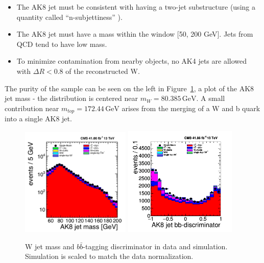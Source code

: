 \begin{itemize}
\item
The AK8 jet must be consistent with having a two-jet substructure (using a quantity called ``n-subjettiness'' \cite{njet1, njet2}).
\item
The AK8 jet must have a mass within the window [50, 200 GeV]. Jets from QCD tend to have low mass.
\item
To minimize contamination from nearby objects, no AK4 jets are allowed with $\Delta R<0.8$ of the reconstructed W. 
\end{itemize}

The purity of the sample can be seen on the left in Figure~\ref{fig:dists}, a plot of the AK8 jet mass - the distribution is centered near $m_{W} = 80.385\,\textrm{GeV}$. A small contribution near $m_{top}=172.44\,\textrm{GeV}$ arises from the merging of a W and b quark into a single AK8 jet.

\begin{figure}[hbp!]
\centering
\includegraphics[width=0.465\textwidth]{figs/ak8jetmass.png}
\includegraphics[width=0.48\textwidth]{figs/ak8jetbbdisc.png}
\caption{W jet mass and $b\bar{b}$-tagging discriminator in data and simulation. Simulation is scaled to match the data normalization.}
\label{fig:dists}
\end{figure}

